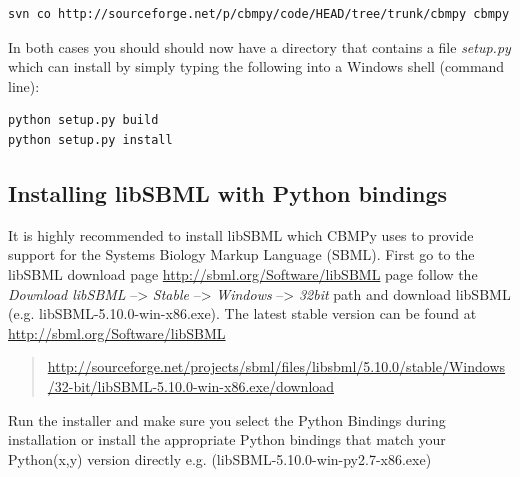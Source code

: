 \documentclass[a4paper,11pt,english]{sphinxmanual}
\begin{document}
\begin{Verbatim}[commandchars=\\\{\}]
svn co http://sourceforge.net/p/cbmpy/code/HEAD/tree/trunk/cbmpy cbmpy
\end{Verbatim}

In both cases you should should now have a directory that contains a file
\emph{setup.py} which can install by simply typing the following into a Windows shell
(command line):

\begin{Verbatim}[commandchars=\\\{\}]
python setup.py build
python setup.py install
\end{Verbatim}


\subsection{Installing libSBML with Python bindings}
\label{install_doc:installing-libsbml-with-python-bindings}
It is highly recommended to install libSBML which CBMPy uses to provide support
for the Systems Biology Markup Language (SBML). First go to the libSBML download
page \href{http://sbml.org/Software/libSBML}{http://sbml.org/Software/libSBML} page follow the \emph{Download libSBML} --\textgreater{} \emph{Stable} --\textgreater{}
\emph{Windows} --\textgreater{} \emph{32bit} path and download libSBML (e.g. libSBML-5.10.0-win-x86.exe). The latest
stable version can be found at \href{http://sbml.org/Software/libSBML}{http://sbml.org/Software/libSBML}
\begin{quote}

\href{http://sourceforge.net/projects/sbml/files/libsbml/5.10.0/stable/Windows/32-bit/libSBML-5.10.0-win-x86.exe/download}{http://sourceforge.net/projects/sbml/files/libsbml/5.10.0/stable/Windows/32-bit/libSBML-5.10.0-win-x86.exe/download}
\end{quote}

Run the installer and make sure you select the Python Bindings during installation
or install the appropriate Python bindings that match your Python(x,y) version directly e.g.
(libSBML-5.10.0-win-py2.7-x86.exe)
\end{document}
